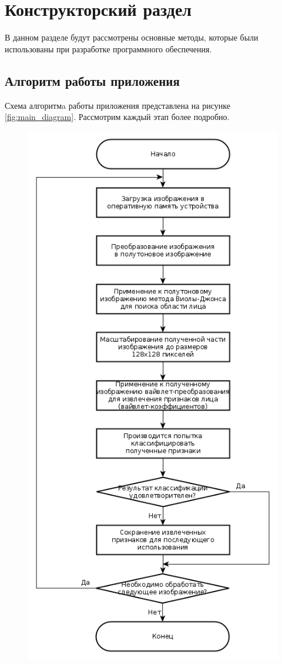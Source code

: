 \section{Конструкторский раздел}

В данном разделе будут рассмотрены основные методы, которые были использованы
при разработке программного обеспечения.

\subsection{Алгоритм работы приложения}

Схема алгоритмa работы приложения представлена на рисунке \ref{fig:main_diagram}.
Рассмотрим каждый этап более подробно.

\begin{figure}[p]
    \centering
    \includegraphics[height=.95\textheight]{main_diagram.png}

\end{figure}
